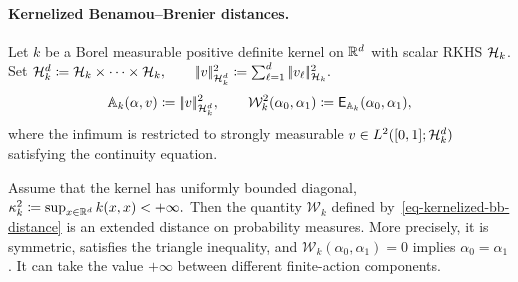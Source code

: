 \paragraph{Kernelized Benamou--Brenier distances.}\label{sec-kernelized-bb-distance}
\begin{defn}\label{def-kernelized-bb-distance}
Let $k$ be a Borel measurable positive definite kernel on $\mathbb{R}^d$ with scalar RKHS $\mathcal{H}_k$. Set
\(\mathcal{H}_k^d\coloneqq \mathcal{H}_k\times\cdots\times\mathcal{H}_k, \qquad |\!| v |\!|_{\mathcal{H}_k^d}^2 \coloneqq \sum_{\ell=1}^d|\!| v_\ell |\!|_{\mathcal{H}_k}^2.\)
\begin{equation}\label{eq-kernelized-bb-distance}
\mathbb A_k(\alpha,v)
\coloneqq
|\!| v |\!|_{\mathcal{H}_k^d}^2,
\qquad
\mathcal W_k^2(\alpha_0,\alpha_1)
\coloneqq
\mathsf E_{\mathbb A_k}(\alpha_0,\alpha_1),
\end{equation}
where the infimum is restricted to strongly measurable $v\in L^2([0,1];\mathcal{H}_k^d)$ satisfying the continuity equation.
\end{defn}
\begin{prop}\label{prop-kernelized-bb-distance}
Assume that the kernel has uniformly bounded diagonal, \(\kappa_k^2\coloneqq\sup_{x\in\mathbb{R}^d}k(x,x)<+\infty.\)
Then the quantity \(\mathcal W_k\) defined by~\eqref{eq-kernelized-bb-distance} is an extended distance on probability measures. More precisely, it is symmetric, satisfies the triangle inequality, and \(\mathcal W_k(\alpha_0,\alpha_1)=0\) implies \(\alpha_0=\alpha_1\). It can take the value \(+\infty\) between different finite-action components.
\end{prop}
